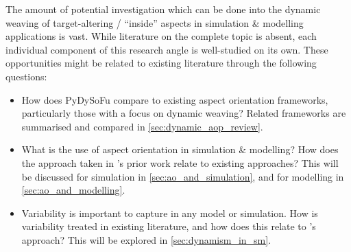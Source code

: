 
The amount of potential investigation which can be done into the dynamic weaving
of target-altering / ``inside'' aspects in simulation \& modelling applications
is vast. While literature on the complete topic is absent, each individual
component of this research angle is well-studied on its own. These opportunities
might be related to existing literature through the following questions:

\begin{itemize}
    \item How does PyDySoFu compare to existing aspect orientation frameworks,
    particularly those with a focus on dynamic weaving? Related frameworks are
    summarised and compared in \cref{sec:dynamic_aop_review}.

    \item What is the use of aspect orientation in simulation \& modelling? How
    does the approach taken in \pdsf's prior work relate to existing
    approaches? This will be discussed for simulation in
    \cref{sec:ao_and_simulation}, and for modelling in
    \cref{sec:ao_and_modelling}.
    
    \item Variability is important to capture in any \sociotechnical model or
    simulation. How is variability treated in existing literature, and how does
    this relate to \pdsf's approach? This will be explored in
    \cref{sec:dynamism_in_sm}.
\end{itemize}

